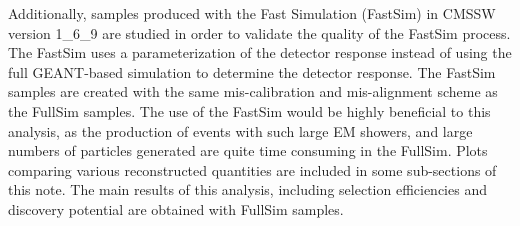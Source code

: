\documentclass[colclass=cmspaper]{combine}
\begin{document}
\begin{linenumbers}
Additionally, samples produced with the Fast Simulation (FastSim) in CMSSW version 1\_6\_9 are 
studied in order to validate the quality of the FastSim process. The FastSim uses a parameterization 
of the detector response instead of using the full GEANT-based simulation to determine the detector response.
The FastSim samples are created with the same mis-calibration and mis-alignment scheme as the FullSim samples. 
The use of the FastSim would be highly beneficial to this analysis, as the production of events with such large EM showers, and large numbers of particles generated 
are quite time consuming in the FullSim.  
Plots comparing various reconstructed quantities are included in some sub-sections of this note.  
The main results of this analysis, including selection efficiencies and discovery potential are obtained with FullSim samples.


\end{linenumbers}
\end{document}
